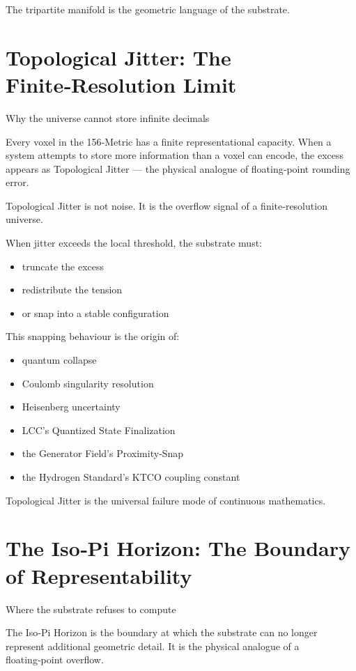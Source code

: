 \documentclass[reprint,amsmath,amssymb,aps,prl,floatfix]{revtex4-2}
\begin{document}
\begin{itemize}
The tripartite manifold is the geometric language of the substrate.

\section{Topological Jitter: The Finite‑Resolution Limit}

Why the universe cannot store infinite decimals
\medskip


Every voxel in the 156‑Metric has a finite representational capacity.  
When a system attempts to store more information than a voxel can encode, the excess appears as Topological Jitter — the physical analogue of floating‑point rounding error.
\medskip


Topological Jitter is not noise.  
It is the overflow signal of a finite‑resolution universe.
\medskip


When jitter exceeds the local threshold, the substrate must:
\begin{itemize}
\item truncate the excess  
\item redistribute the tension  
\item or snap into a stable configuration  
\end{itemize}
\medskip


This snapping behaviour is the origin of:

\begin{itemize}
\item quantum collapse  
\item Coulomb singularity resolution  
\item Heisenberg uncertainty  
\item LCC’s Quantized State Finalization  
\item the Generator Field’s Proximity‑Snap  
\item the Hydrogen Standard’s KTCO coupling constant  
\end{itemize}

Topological Jitter is the universal failure mode of continuous mathematics.
\medskip
\section{The Iso‑Pi Horizon: The Boundary of Representability}

Where the substrate refuses to compute

The Iso‑Pi Horizon is the boundary at which the substrate can no longer represent additional geometric detail. It is the physical analogue of a floating‑point overflow.


\end{itemize}
\end{document}
